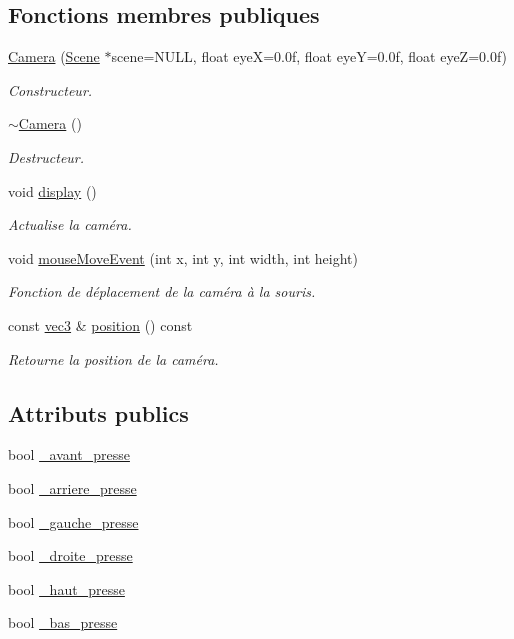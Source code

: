 \subsection*{Fonctions membres publiques}
\begin{DoxyCompactItemize}
\item 
\hyperlink{class_camera_a1a8ac754efe577c8abbc1e19cc8bca25}{Camera} (\hyperlink{class_scene}{Scene} $\ast$scene=N\+U\+L\+L, float eye\+X=0.\+0f, float eye\+Y=0.\+0f, float eye\+Z=0.\+0f)
\begin{DoxyCompactList}\small\item\em Constructeur. \end{DoxyCompactList}\item 
\hyperlink{class_camera_ad1897942d0ccf91052386388a497349f}{$\sim$\+Camera} ()
\begin{DoxyCompactList}\small\item\em Destructeur. \end{DoxyCompactList}\item 
void \hyperlink{class_camera_adbfdac30f082ddea86183c1c31493946}{display} ()
\begin{DoxyCompactList}\small\item\em Actualise la caméra. \end{DoxyCompactList}\item 
void \hyperlink{class_camera_a22aaf20b581d402e5c3952655b830c0f}{mouse\+Move\+Event} (int x, int y, int width, int height)
\begin{DoxyCompactList}\small\item\em Fonction de déplacement de la caméra à la souris. \end{DoxyCompactList}\item 
const \hyperlink{structvec3}{vec3} \& \hyperlink{class_camera_ad42b0114b12a48474ae6c8be1c44e7bb}{position} () const 
\begin{DoxyCompactList}\small\item\em Retourne la position de la caméra. \end{DoxyCompactList}\end{DoxyCompactItemize}
\subsection*{Attributs publics}
\begin{DoxyCompactItemize}
\item 
bool \hyperlink{class_camera_a4cab15e35a96fdcb2a8599fea13a9b8f}{\+\_\+avant\+\_\+presse}
\item 
bool \hyperlink{class_camera_a0ce12f74953fcd53192e48f8b4164e2e}{\+\_\+arriere\+\_\+presse}
\item 
bool \hyperlink{class_camera_ac2a5c37c4f9603a14e3616d6a75f7998}{\+\_\+gauche\+\_\+presse}
\item 
bool \hyperlink{class_camera_a61b2e438537b99ba1f0a97e5586b7f45}{\+\_\+droite\+\_\+presse}
\item 
bool \hyperlink{class_camera_a43b59b53cb182906d56e6e4d2c31139c}{\+\_\+haut\+\_\+presse}
\item 
bool \hyperlink{class_camera_aaba6828f97c9ef07b6b135a665bd3008}{\+\_\+bas\+\_\+presse}
\end{DoxyCompactItemize}
